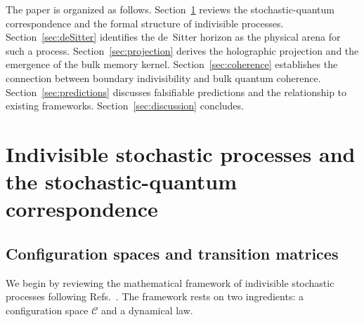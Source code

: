 \documentclass[aps,prd,twocolumn,superscriptaddress,nofootinbib]{revtex4-2}
\begin{document}
The paper is organized as follows. Section~\ref{sec:SQC} reviews the stochastic-quantum correspondence and the formal structure of indivisible processes. Section~\ref{sec:deSitter} identifies the de~Sitter horizon as the physical arena for such a process. Section~\ref{sec:projection} derives the holographic projection and the emergence of the bulk memory kernel. Section~\ref{sec:coherence} establishes the connection between boundary indivisibility and bulk quantum coherence. Section~\ref{sec:predictions} discusses falsifiable predictions and the relationship to existing frameworks. Section~\ref{sec:discussion} concludes.



\section{Indivisible stochastic processes and the stochastic-quantum correspondence}
\label{sec:SQC}

\subsection{Configuration spaces and transition matrices}

We begin by reviewing the mathematical framework of indivisible stochastic processes following Refs.~\cite{Barandes2025SQC,Barandes2025SQT,Barandes2025QSIP}. The framework rests on two ingredients: a configuration space $\mathcal{C}$ and a dynamical law.
\end{document}

